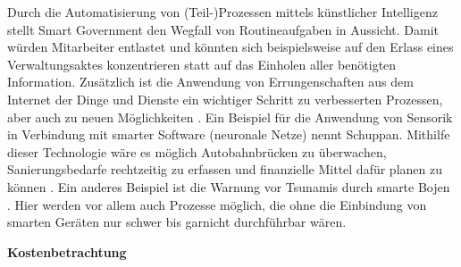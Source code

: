Durch die Automatisierung von (Teil-)Prozessen mittels künstlicher Intelligenz stellt Smart Government den Wegfall von Routineaufgaben in Aussicht.
Damit würden Mitarbeiter entlastet und könnten sich beispielsweise auf den Erlass eines Verwaltungsaktes konzentrieren statt auf das Einholen aller benötigten Information.
Zusätzlich ist die Anwendung von Errungenschaften aus dem Internet der Dinge und Dienste ein wichtiger Schritt zu verbesserten Prozessen, aber auch zu neuen Möglichkeiten \citep[][]{Lucke2016}.  
Ein Beispiel für die Anwendung von Sensorik in Verbindung mit smarter Software (neuronale Netze) nennt Schuppan.
Mithilfe dieser Technologie wäre es möglich Autobahnbrücken zu überwachen, Sanierungsbedarfe rechtzeitig zu erfassen und finanzielle Mittel dafür planen zu können \citep[][]{Schuppan2016}.
Ein anderes Beispiel ist die Warnung vor Tsunamis durch smarte Bojen \citep[][]{Lucke2016}.
Hier werden vor allem auch Prozesse möglich, die ohne die Einbindung von smarten Geräten nur schwer bis garnicht durchführbar wären.

\textbf{Kostenbetrachtung}\\

